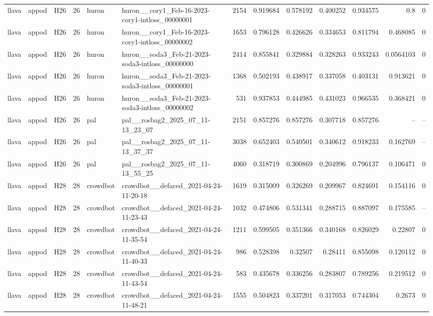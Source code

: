 \begin{longtable}{lllrllrrrrrrr}
llava & appod & H26 & 26 & huron & huron\_\_cory1\_Feb-16-2023-cory1-intloss\_00000001 & 2154 & 0.919684 & 0.578192 & 0.400252 & 0.934575 & 0.8 & 0 \\
llava & appod & H26 & 26 & huron & huron\_\_cory1\_Feb-16-2023-cory1-intloss\_00000002 & 1653 & 0.796128 & 0.426626 & 0.334653 & 0.811794 & 0.468085 & 0 \\
llava & appod & H26 & 26 & huron & huron\_\_soda3\_Feb-21-2023-soda3-intloss\_00000000 & 2414 & 0.855841 & 0.329884 & 0.328263 & 0.933243 & 0.0564103 & 0 \\
llava & appod & H26 & 26 & huron & huron\_\_soda3\_Feb-21-2023-soda3-intloss\_00000001 & 1368 & 0.502193 & 0.438917 & 0.337058 & 0.403131 & 0.913621 & 0 \\
llava & appod & H26 & 26 & huron & huron\_\_soda3\_Feb-21-2023-soda3-intloss\_00000002 & 531 & 0.937853 & 0.444985 & 0.431023 & 0.966535 & 0.368421 & 0 \\
llava & appod & H26 & 26 & pal & pal\_\_rosbag2\_2025\_07\_11-13\_23\_07 & 2151 & 0.857276 & 0.857276 & 0.307718 & 0.857276 & -- & -- \\
llava & appod & H26 & 26 & pal & pal\_\_rosbag2\_2025\_07\_11-13\_37\_37 & 3038 & 0.652403 & 0.540501 & 0.340612 & 0.918233 & 0.162769 & -- \\
llava & appod & H26 & 26 & pal & pal\_\_rosbag2\_2025\_07\_11-13\_55\_25 & 4060 & 0.318719 & 0.300869 & 0.204996 & 0.796137 & 0.106471 & 0 \\
llava & appod & H28 & 28 & crowdbot & crowdbot\_\_defaced\_2021-04-24-11-20-18 & 1619 & 0.315009 & 0.326269 & 0.209967 & 0.824691 & 0.154116 & 0 \\
llava & appod & H28 & 28 & crowdbot & crowdbot\_\_defaced\_2021-04-24-11-23-43 & 1032 & 0.474806 & 0.531341 & 0.288715 & 0.887097 & 0.175585 & -- \\
llava & appod & H28 & 28 & crowdbot & crowdbot\_\_defaced\_2021-04-24-11-35-54 & 1211 & 0.599505 & 0.351366 & 0.340168 & 0.826029 & 0.22807 & 0 \\
llava & appod & H28 & 28 & crowdbot & crowdbot\_\_defaced\_2021-04-24-11-40-33 & 986 & 0.528398 & 0.32507 & 0.28411 & 0.855098 & 0.120112 & 0 \\
llava & appod & H28 & 28 & crowdbot & crowdbot\_\_defaced\_2021-04-24-11-43-54 & 583 & 0.435678 & 0.336256 & 0.283807 & 0.789256 & 0.219512 & 0 \\
llava & appod & H28 & 28 & crowdbot & crowdbot\_\_defaced\_2021-04-24-11-48-21 & 1555 & 0.504823 & 0.337201 & 0.317053 & 0.744304 & 0.2673 & 0 \\

\end{longtable}
